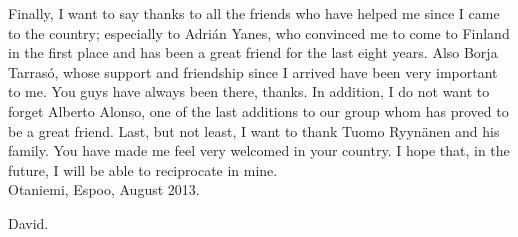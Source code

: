 Finally, I want to say thanks to all the friends who have helped me since I came to the country; especially to Adrián Yanes, who convinced me to come to Finland in the first place and has been a great friend for the last eight years. Also Borja Tarrasó, whose support and friendship since I arrived have been very important to me. You guys have always been there, thanks. In addition, I do not want to forget Alberto Alonso, one of the last additions to our group whom has proved to be a great friend. Last, but not least, I want to thank Tuomo Ryynänen and his family. You have made me feel very welcomed in your country. I hope that, in the future, I will be able to reciprocate in mine.\\




\vspace{1cm}
Otaniemi, Espoo, August 2013.

\vspace{0.5cm}
David.
\thispagestyle{plain}
\pagebreak

\tableofcontents

\pagebreak
